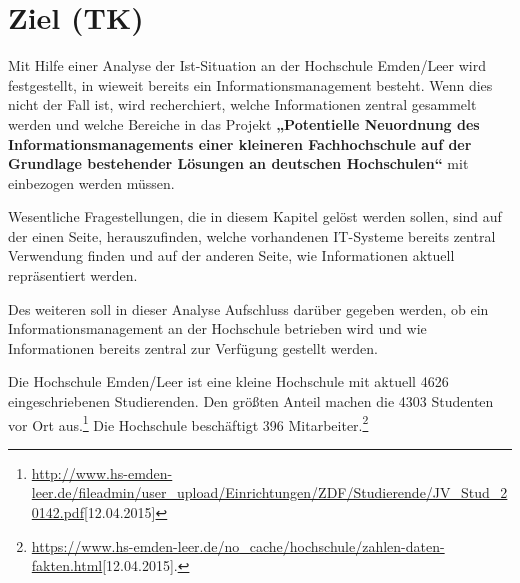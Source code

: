 \section{Ziel (TK)}
Mit Hilfe einer Analyse der Ist-Situation an der Hochschule Emden/Leer wird festgestellt, 
in wieweit bereits ein Informationsmanagement besteht. Wenn dies nicht der Fall ist, wird 
recherchiert, welche Informationen zentral gesammelt werden und welche Bereiche in das 
Projekt \textbf{„Potentielle Neuordnung des Informationsmanagements einer kleineren 
Fachhochschule auf der Grundlage bestehender Lösungen an deutschen Hochschulen“} 
mit einbezogen werden müssen.

Wesentliche Fragestellungen, die in diesem Kapitel gelöst werden sollen, sind auf der 
einen Seite, herauszufinden, welche vorhandenen IT-Systeme bereits zentral Verwendung 
finden und auf der anderen Seite, wie Informationen aktuell repräsentiert werden. 

Des weiteren soll in dieser Analyse Aufschluss darüber gegeben werden, ob ein 
Informationsmanagement an der Hochschule betrieben wird und wie Informationen 
bereits zentral zur Verfügung gestellt werden.

Die Hochschule Emden/Leer ist eine kleine Hochschule mit aktuell 4626 eingeschriebenen 
Studierenden. Den größten Anteil machen die 4303 Studenten vor Ort aus.\footnote{\url{http://www.hs-emden-leer.de/fileadmin/user_upload/Einrichtungen/ZDF/Studierende/JV_Stud_20142.pdf}[12.04.2015]} 
Die Hochschule beschäftigt 396 Mitarbeiter.\footnote{\url{https://www.hs-emden-leer.de/no_cache/hochschule/zahlen-daten-fakten.html}[12.04.2015].}